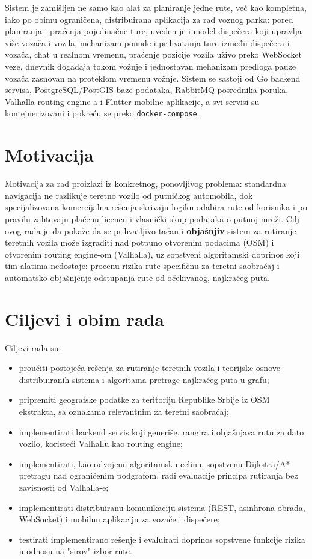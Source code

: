 Sistem je zamišljen ne samo kao alat za planiranje jedne rute, već kao kompletna, iako po obimu ograničena, distribuirana aplikacija za rad voznog parka: pored planiranja i praćenja pojedinačne ture, uveden je i model dispečera koji upravlja više vozača i vozila, mehanizam ponude i prihvatanja ture između dispečera i vozača, chat u realnom vremenu, praćenje pozicije vozila uživo preko WebSocket veze, dnevnik događaja tokom vožnje i jednostavan mehanizam predloga pauze vozača zasnovan na proteklom vremenu vožnje. Sistem se sastoji od Go backend servisa, PostgreSQL/PostGIS baze podataka, RabbitMQ posrednika poruka, Valhalla routing engine-a i Flutter mobilne aplikacije, a svi servisi su kontejnerizovani i pokreću se preko \texttt{docker-compose}.

\section{Motivacija}

Motivacija za rad proizlazi iz konkretnog, ponovljivog problema: standardna navigacija ne razlikuje teretno vozilo od putničkog automobila, dok specijalizovana komercijalna rešenja skrivaju logiku odabira rute od korisnika i po pravilu zahtevaju plaćenu licencu i vlasnički skup podataka o putnoj mreži. Cilj ovog rada je da pokaže da se prihvatljivo tačan i \textbf{objašnjiv} sistem za rutiranje teretnih vozila može izgraditi nad potpuno otvorenim podacima (OSM) i otvorenim routing engine-om (Valhalla), uz sopstveni algoritamski doprinos koji tim alatima nedostaje: procenu rizika rute specifičnu za teretni saobraćaj i automatsko objašnjenje odstupanja rute od očekivanog, najkraćeg puta.

\section{Ciljevi i obim rada}

Ciljevi rada su:

\begin{itemize}
\item proučiti postojeća rešenja za rutiranje teretnih vozila i teorijske osnove distribuiranih sistema i algoritama pretrage najkraćeg puta u grafu;
\item pripremiti geografske podatke za teritoriju Republike Srbije iz OSM ekstrakta, sa oznakama relevantnim za teretni saobraćaj;
\item implementirati backend servis koji generiše, rangira i objašnjava rutu za dato vozilo, koristeći Valhallu kao routing engine;
\item implementirati, kao odvojenu algoritamsku celinu, sopstvenu Dijkstra/A* pretragu nad ograničenim podgrafom, radi evaluacije principa rutiranja bez zavisnosti od Valhalla-e;
\item implementirati distribuiranu komunikaciju sistema (REST, asinhrona obrada, WebSocket) i mobilnu aplikaciju za vozače i dispečere;
\item testirati implementirano rešenje i evaluirati doprinos sopstvene funkcije rizika u odnosu na "sirov" izbor rute.
\end{itemize}

